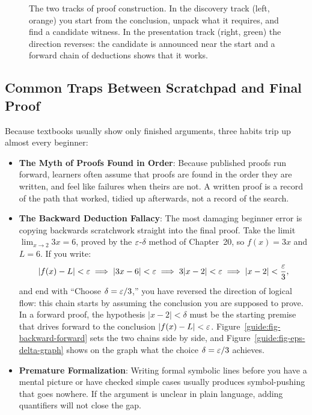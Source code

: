 \begin{figure}[htbp]
\caption{The two tracks of proof construction. In the discovery track (left, orange) you start from the conclusion, unpack what it requires, and find a candidate witness. In the presentation track (right, green) the direction reverses: the candidate is announced near the start and a forward chain of deductions shows that it works.}\label{guide:fig-two-tracks}
\end{figure}

\subsection{Common Traps Between Scratchpad and Final Proof}

Because textbooks usually show only finished arguments, three habits trip up almost every beginner:

\begin{itemize}
  \item \textbf{The Myth of Proofs Found in Order}: Because published proofs run forward, learners often assume that proofs are found in the order they are written, and feel like failures when theirs are not. A written proof is a record of the path that worked, tidied up afterwards, not a record of the search.
  \item \textbf{The Backward Deduction Fallacy}: The most damaging beginner error is copying backwards scratchwork straight into the final proof. Take the limit $\lim_{x \to 2} 3x = 6$, proved by the $\varepsilon$-$\delta$ method of Chapter~20, so $f(x) = 3x$ and $L = 6$. If you write:
  \[
  |f(x) - L| < \varepsilon \implies |3x - 6| < \varepsilon \implies 3|x - 2| < \varepsilon \implies |x - 2| < \frac{\varepsilon}{3},
  \]
  and end with ``Choose $\delta = \varepsilon/3$,'' you have reversed the direction of logical flow: this chain starts by assuming the conclusion you are supposed to prove. In a forward proof, the hypothesis $|x - 2| < \delta$ must be the starting premise that drives forward to the conclusion $|f(x) - L| < \varepsilon$. Figure~\ref{guide:fig-backward-forward} sets the two chains side by side, and Figure~\ref{guide:fig-eps-delta-graph} shows on the graph what the choice $\delta = \varepsilon/3$ achieves.
  \item \textbf{Premature Formalization}: Writing formal symbolic lines before you have a mental picture or have checked simple cases usually produces symbol-pushing that goes nowhere. If the argument is unclear in plain language, adding quantifiers will not close the gap.
\end{itemize}

